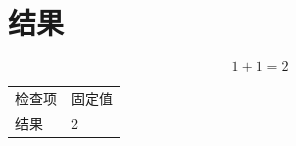 \section{结果}\label{sec:result}
\begin{equation}\label{eq:sum}
1+1=2
\end{equation}
\begin{tabular}{ll}
检查项 & 固定值\\
结果 & 2\\
\end{tabular}
